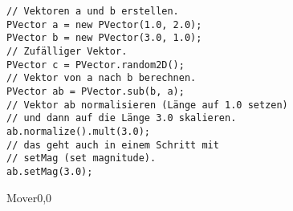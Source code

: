 \documentclass[9pt, a4paper, ngerman]{arbeitsblatt}
\begin{document}
\begin{links}[.5]\centering
\begin{verbatim}
// Vektoren a und b erstellen.
PVector a = new PVector(1.0, 2.0);
PVector b = new PVector(3.0, 1.0);
// Zufälliger Vektor.
PVector c = PVector.random2D();
// Vektor von a nach b berechnen.
PVector ab = PVector.sub(b, a);
// Vektor ab normalisieren (Länge auf 1.0 setzen)
// und dann auf die Länge 3.0 skalieren.
ab.normalize().mult(3.0);
// das geht auch in einem Schritt mit
// setMag (set magnitude).
ab.setMag(3.0);
\end{verbatim}
\end{links}\begin{rechts}[.5]\centering
	\begin{klassendiagramm}%
		\begin{class}[text width=8cm]{Mover}{0,0}

		\end{class}
	\end{klassendiagramm}
\end{rechts}
\end{document}
